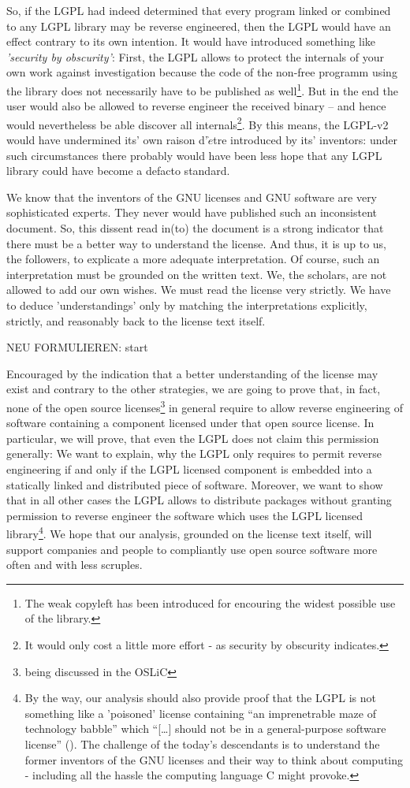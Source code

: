 So, if the LGPL had indeed determined that every program linked or combined to
any LGPL library may be reverse engineered, then the LGPL would have an effect
contrary to its own intention. It would have introduced something like
\emph{'security by obscurity'}: First, the LGPL allows to protect the internals
of your own work against investigation because the code of the non-free programm
using the library does not necessarily have to be published as well\footnote{The
weak copyleft has been introduced for encouring the widest possible use of the
library.}. But in the end the user would also be allowed to reverse engineer the
received binary -- and hence would nevertheless be able discover all
internals\footnote{It would only cost a little more effort - as security by
obscurity indicates.}. By this means, the LGPL-v2 would have undermined its' own
raison d'$\grave{e}$tre introduced by its' inventors: under such circumstances
there probably would have been less hope that any LGPL library could have become
a defacto standard.

We know that the inventors of the GNU licenses and GNU software are very
sophisticated experts. They never would have published such an inconsistent
document. So, this dissent read in(to) the document is a strong indicator that
there must be a better way to understand the license. And thus, it is up to us,
the followers, to explicate a more adequate interpretation. Of course, such an
interpretation must be grounded on the written text. We, the scholars, are not
allowed to add our own wishes. We must read the license very strictly. We have
to deduce 'understandings' only by matching the interpretations explicitly,
strictly, and reasonably back to the license text itself.


NEU FORMULIEREN: start

Encouraged by the indication that a better understanding of the license may
exist and contrary to the other strategies, we are going to prove that, in
fact, none of the open source licenses\footnote{being discussed in the OSLiC} in
general require to allow reverse engineering of software containing a component
licensed under that open source license. In particular, we will prove, that even
the LGPL does not claim this permission generally: We want to explain, why the
LGPL only requires to permit reverse engineering if and only if the LGPL
licensed component is embedded into a statically linked and distributed piece of
software. Moreover, we want to show that in all other cases the LGPL allows 
to distribute packages without granting permission to reverse engineer the
software which uses the LGPL licensed library\footnote{By the way, our analysis
should also provide proof that the LGPL is not something like a 'poisoned'
license containing \enquote{an imprenetrable maze of technology babble} which
\enquote{[\ldots] should not be in a general-purpose software license}
(\cite[cf.][124]{Rosen2005a}). The challenge of the today's descendants is to
understand the former inventors of the GNU licenses and their way to think about
computing - including all the hassle the computing language C might provoke.}.
We hope that our analysis, grounded on the license text itself, will support
companies and people to compliantly use open source software more often and with
less scruples.

